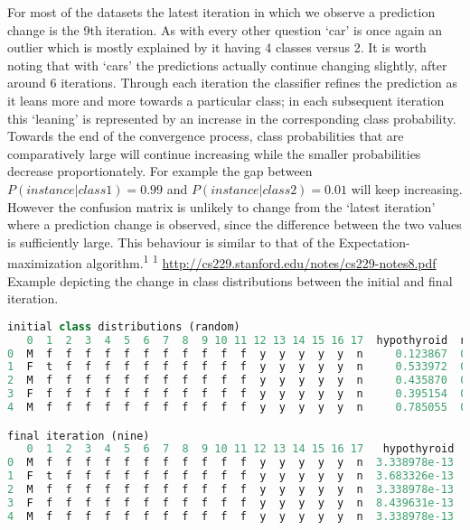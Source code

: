 \documentclass[a4paper]{article}
\begin{document}
For most of the datasets the latest iteration in which we observe a prediction change is the 9th iteration. As with every other question ‘car’ is once again an outlier which is mostly explained by it having 4 classes versus 2. It is worth noting that with ‘cars’ the predictions actually continue changing slightly, after around 6 iterations.
\newline
\newline
Through each iteration the classifier refines the prediction as it leans more and more towards a particular class;  in each subsequent iteration this ‘leaning’ is represented by an increase in the corresponding class probability. Towards the end of the convergence process, class probabilities that are comparatively large will continue increasing while the smaller probabilities decrease proportionately. For example the gap between $P(instance|class1) = 0.99$ and $P(instance|class2) = 0.01$ will keep increasing. However the confusion matrix is unlikely to change from the ‘latest iteration’ where a prediction change is observed, since the difference between the two values is sufficiently large. This behaviour is similar to that of the Expectation-maximization algorithm.\textsuperscript{1}
\newline
\newline
\textsuperscript{1} \url{http://cs229.stanford.edu/notes/cs229-notes8.pdf}
\newline
\newline
Example depicting the change in class distributions between the initial and final iteration.
\begin{lstlisting}[language=Python]
initial class distributions (random)
   0  1  2  3  4  5  6  7  8  9 10 11 12 13 14 15 16 17  hypothyroid  negative
0  M  f  f  f  f  f  f  f  f  f  f  f  y  y  y  y  y  n     0.123867  0.876133
1  F  t  f  f  f  f  f  f  f  f  f  f  y  y  y  y  y  n     0.533972  0.466028
2  M  f  f  f  f  f  f  f  f  f  f  f  y  y  y  y  y  n     0.435870  0.564130
3  F  f  f  f  f  f  f  f  f  f  f  f  y  y  y  y  y  n     0.395154  0.604846
4  M  f  f  f  f  f  f  f  f  f  f  f  y  y  y  y  y  n     0.785055  0.214945

final iteration (nine)
   0  1  2  3  4  5  6  7  8  9 10 11 12 13 14 15 16 17   hypothyroid  negative
0  M  f  f  f  f  f  f  f  f  f  f  f  y  y  y  y  y  n  3.338978e-13  1.0
1  F  t  f  f  f  f  f  f  f  f  f  f  y  y  y  y  y  n  3.683326e-13  1.0
2  M  f  f  f  f  f  f  f  f  f  f  f  y  y  y  y  y  n  3.338978e-13  1.0
3  F  f  f  f  f  f  f  f  f  f  f  f  y  y  y  y  y  n  8.439631e-13  1.0
4  M  f  f  f  f  f  f  f  f  f  f  f  y  y  y  y  y  n  3.338978e-13  1.0
\end{lstlisting}
\end{document}
